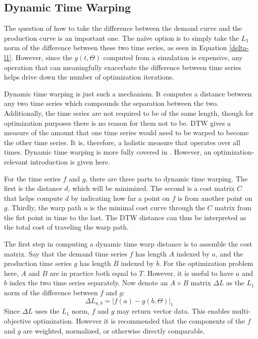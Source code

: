 \subsection{Dynamic Time Warping}
\label{dtw}

The question of how to take the difference between the demand curve and
the production curve is an important one. The na\"ive option is to simply
take the $L_1$ norm of the difference between these two time series, as
seen in Equation \ref{delta-l1}.  However, since the $g(t, \Theta)$ computed
from a simulation is expensive, any operation that can meaningfully
exacerbate the difference between time series helps drive down the number
of optimization iterations.

Dynamic time warping is just such a mechanism. It computes
a distance between any two time series which compounds the separation
between the two. Additionally, the time series are not required to be of the
same length, though for optimization purposes there is no reason for them
not to be. DTW gives a measure of the amount that one time series would need to
be warped to become the other time series. It is, therefore, a holistic
measure that operates over all times. Dynamic time warping
is more fully covered in \cite{muller}.  However, an
optimization-relevant introduction is given here.

For the time series $f$ and $g$, there are three parts to dynamic time
warping. The first is the distance $d$, which will be minimized. The second
is a cost matrix $C$ that helps compute $d$ by indicating how far a point
on $f$ is from another point on $g$. Thirdly, the warp path $u$ is the
minimal cost curve through the $C$ matrix from the fist point in time to
the last. The DTW distance can thus be interpreted as the
total cost of traveling the warp path.

The first step in computing a dynamic time warp distance is to
assemble the cost matrix. Say that the demand time series $f$ has
length $A$ indexed by $a$, and the production time series $g$ has
length $B$ indexed by $b$. For the optimization problem here, $A$ and $B$
are in practice both equal to $T$.  However, it is useful to have $a$ and
$b$ index the two time series separately. Now denote an $A\times B$ matrix
$\Delta L$ as the $L_1$ norm of the difference between $f$ and $g$:
\begin{equation}
\label{delta-l1}
\Delta L_{a,b} = \left|f(a) - g(b, \Theta)\right|_1
\end{equation}
Since $\Delta L$ uses the $L_1$ norm, $f$ and $g$ may return vector
data. This enables multi-objective optimization. However it is recommended
that the components of the $f$ and $g$ are weighted, normalized, or otherwise
directly comparable.

